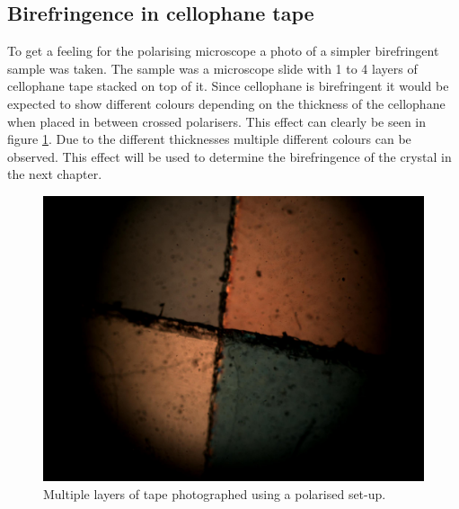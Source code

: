 \newpage
\subsection{Birefringence in cellophane tape}
To get a feeling for the polarising microscope a photo of a simpler birefringent sample was taken. The sample was a microscope slide with 1 to 4 layers of cellophane tape stacked on top of it. Since cellophane is birefringent it would be expected to show different colours depending on the thickness of the cellophane when placed in between crossed polarisers. This effect can clearly be seen in figure \ref{fig:tape}. Due to the different thicknesses multiple different colours can be observed. This effect will be used to determine the birefringence of the crystal in the next chapter.
\begin{figure}[h!]
    \centering
    \includegraphics[width=.4\linewidth]{afbeeldingen/cellophane_tape.jpg}
    \caption{Multiple layers of tape photographed using a polarised set-up.}
    \label{fig:tape}
\end{figure}



